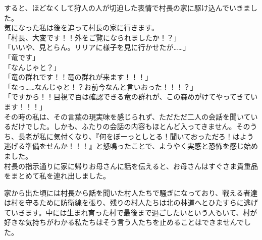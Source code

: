 \documentclass[oneside, a4paper]{jsbook}
\begin{document}
すると、ほどなくして狩人の人が切迫した表情で村長の家に駆け込んでいきました。\\
気になった私は後を追って村長の家に行きます。\\

\noindent
「村長、大変です！！外をご覧になられましたか！？」\\
「いいや、見とらん。リリアに様子を見に行かせたが……」\\
「竜です」\\
「なんじゃと？」\\
「竜の群れです！！竜の群れが来ます！！！」\\
「なっ……なんじゃと！？お前今なんと言いおった！！！？」\\
「ですから！！目視で百は確認できる竜の群れが、この森めがけてやってきています！！！」\\

その時の私は、その言葉の現実味を感じられず、ただただ二人の会話を聞いているだけでした。しかも、ふたりの会話の内容もほとんど入ってきません。そのうち、長老が私に気付くなり、『何をぼーっとしとる！聞いておっただろ！はよう逃げる準備をせんか！！！』と怒鳴ったことで、ようやく実感と恐怖を感じ始めました。\\

村長の指示通りに家に帰りお母さんに話を伝えると、お母さんはすぐさま貴重品をまとめて私を連れ出しました。

家から出た頃には村長から話を聞いた村人たちで騒ぎになっており、戦える者達は村を守るために防衛線を張り、残りの村人たちは北の林道へとひたすらに逃げていきます。中には生まれ育った村で最後まで過ごしたいという人もいて、村が好きな気持ちがわかる私たちはそう言う人たちを止めることはできませんでした。
\end{document}
